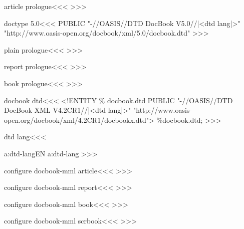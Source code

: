 \<article prologue\><<<
  {}
   {}
>>>

\<doctype 5.0\><<<
PUBLIC "-//OASIS//DTD DocBook V5.0//|<dtd lang|>"\Hnewline
       "http://www.oasis-open.org/docbook/xml/5.0/docbook.dtd"
>>>





\<plain prologue\><<<
   {}
   {}
>>>




\<report prologue\><<<
   {}
   {}
>>>




\<book prologue\><<<
   {}
   {}
>>>


\<docbook dtd\><<<
<!ENTITY \% docbook.dtd PUBLIC\Hnewline
    "-//OASIS//DTD DocBook XML V4.2CR1//|<dtd lang|>"\Hnewline
       "http://www.oasis-open.org/docbook/xml/4.2CR1/docbookx.dtd">
\Hnewline \%docbook.dtd; \Hnewline
>>>


\<dtd lang\><<<
\expandafter
\ifx \csname a:dtd-lang\endcsname\relax EN\else
  \csname a:dtd-lang\endcsname
\fi
>>>



\<configure docbook-mml article\><<< 
   {}
   {}
>>>


\<configure docbook-mml report\><<< 
   {}
   {}
>>>


\<configure docbook-mml book\><<< 
   {}
   {}
>>>


\<configure docbook-mml scrbook\><<< 
   {}
   {}
>>>





